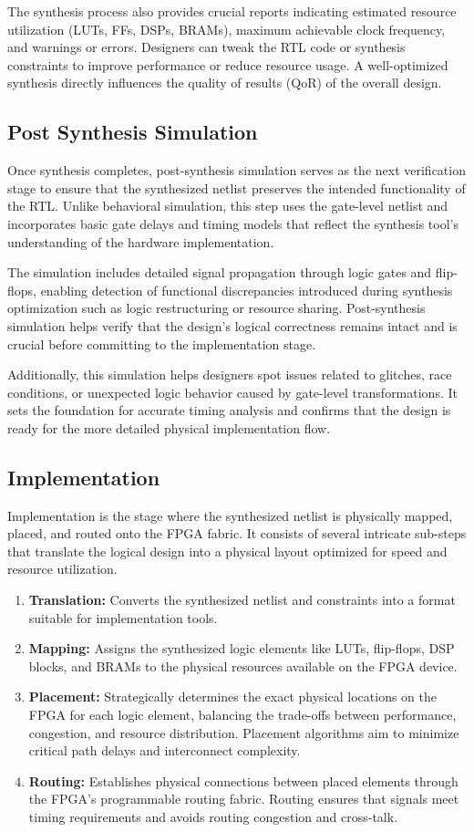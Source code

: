 The synthesis process also provides crucial reports indicating estimated resource utilization (LUTs, FFs, DSPs, BRAMs), maximum achievable clock frequency, and warnings or errors. Designers can tweak the RTL code or synthesis constraints to improve performance or reduce resource usage. A well-optimized synthesis directly influences the quality of results (QoR) of the overall design.

\subsection{Post Synthesis Simulation}
Once synthesis completes, post-synthesis simulation serves as the next verification stage to ensure that the synthesized netlist preserves the intended functionality of the RTL. Unlike behavioral simulation, this step uses the gate-level netlist and incorporates basic gate delays and timing models that reflect the synthesis tool’s understanding of the hardware implementation.

The simulation includes detailed signal propagation through logic gates and flip-flops, enabling detection of functional discrepancies introduced during synthesis optimization such as logic restructuring or resource sharing. Post-synthesis simulation helps verify that the design’s logical correctness remains intact and is crucial before committing to the implementation stage.

Additionally, this simulation helps designers spot issues related to glitches, race conditions, or unexpected logic behavior caused by gate-level transformations. It sets the foundation for accurate timing analysis and confirms that the design is ready for the more detailed physical implementation flow.

\subsection{Implementation}
Implementation is the stage where the synthesized netlist is physically mapped, placed, and routed onto the FPGA fabric. It consists of several intricate sub-steps that translate the logical design into a physical layout optimized for speed and resource utilization.
\begin{enumerate}
	\item \textbf{Translation:} Converts the synthesized netlist and constraints into a format suitable for implementation tools.
	\item \textbf{Mapping:} Assigns the synthesized logic elements like LUTs, flip-flops, DSP blocks, and BRAMs to the physical resources available on the FPGA device.
	\item \textbf{Placement:} Strategically determines the exact physical locations on the FPGA for each logic element, balancing the trade-offs between performance, congestion, and resource distribution. Placement algorithms aim to minimize critical path delays and interconnect complexity.
	\item \textbf{Routing:} Establishes physical connections between placed elements through the FPGA’s programmable routing fabric. Routing ensures that signals meet timing requirements and avoids routing congestion and cross-talk.
\end{enumerate}

